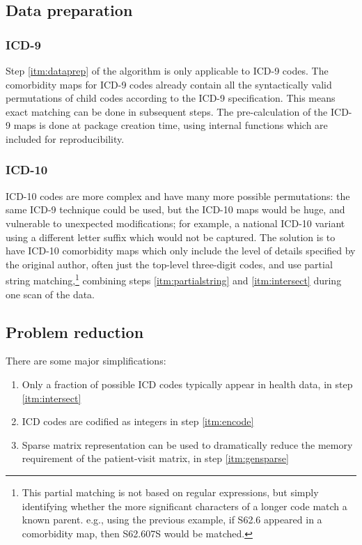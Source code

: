 \documentclass[article]{jss}
\providecommand{\tightlist}{%
  \setlength{\itemsep}{0pt}\setlength{\parskip}{0pt}}
\begin{document}
\hypertarget{data-preparation}{%
\subsection{Data preparation}\label{data-preparation}}

\hypertarget{icd-9}{%
\subsubsection{ICD-9}\label{icd-9}}

Step \ref{itm:dataprep} of the algorithm is only applicable to ICD-9
codes. The comorbidity maps for ICD-9 codes already contain all the
syntactically valid permutations of child codes according to the ICD-9
specification. This means exact matching can be done in subsequent
steps. The pre-calculation of the ICD-9 maps is done at package creation
time, using internal functions which are included for reproducibility.

\hypertarget{icd-10}{%
\subsubsection{ICD-10}\label{icd-10}}

ICD-10 codes are more complex and have many more possible permutations:
the same ICD-9 technique could be used, but the ICD-10 maps would be
huge, and vulnerable to unexpected modifications; for example, a
national ICD-10 variant using a different letter suffix which would not
be captured. The solution is to have ICD-10 comorbidity maps which only
include the level of details specified by the original author, often
just the top-level three-digit codes, and use partial string
matching,\footnote{This partial matching is not based on regular
  expressions, but simply identifying whether the more significant
  characters of a longer code match a known parent. e.g., using the
  previous example, if S62.6 appeared in a comorbidity map, then
  S62.607S would be matched.} combining steps \ref{itm:partialstring}
and \ref{itm:intersect} during one scan of the data.

\hypertarget{problem-reduction}{%
\subsection{Problem reduction}\label{problem-reduction}}

There are some major simplifications:

\begin{enumerate}
\def\labelenumi{\arabic{enumi}.}
\tightlist
\item
  Only a fraction of possible ICD codes typically appear in health data,
  in step \ref{itm:intersect}
\item
  ICD codes are codified as integers in step \ref{itm:encode}
\item
  Sparse matrix representation can be used to dramatically reduce the
  memory requirement of the patient-visit matrix, in step
  \ref{itm:gensparse}
\end{enumerate}
\end{document}
